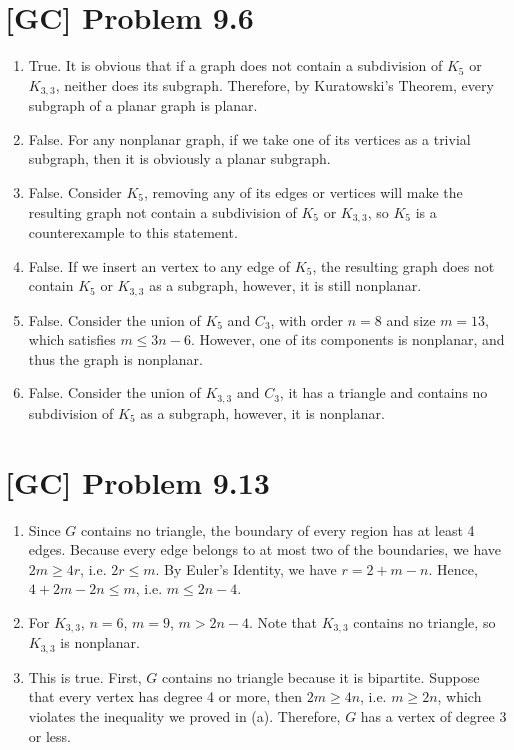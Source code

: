 \documentclass[a4paper,11pt,twocolumn]{article}
\begin{document}
  \section{[GC] Problem 9.6}
  \begin{enumerate}
    \item True. It is obvious that if a graph does not contain a subdivision of $K_5$ or $K_{3,3}$, neither does its subgraph. Therefore, by Kuratowski's Theorem, every subgraph of a planar graph is planar.
    \item False. For any nonplanar graph, if we take one of its vertices as a trivial subgraph, then it is obviously a planar subgraph.
    \item False. Consider $K_5$, removing any of its edges or vertices will make the resulting graph not contain a subdivision of $K_5$ or $K_{3,3}$, so $K_5$ is a counterexample to this statement.
    \item False. If we insert an vertex to any edge of $K_5$, the resulting graph does not contain $K_5$ or $K_{3,3}$ as a subgraph, however, it is still nonplanar.
    \item False. Consider the union of $K_5$ and $C_3$, with order $n = 8$ and size $m = 13$, which satisfies $m \leq 3n-6$. However, one of its components is nonplanar, and thus the graph is nonplanar.
    \item False. Consider the union of $K_{3,3}$ and $C_3$, it has a triangle and contains no subdivision of $K_5$ as a subgraph, however, it is  nonplanar.
  \end{enumerate}

  \section{[GC] Problem 9.13}
  \begin{enumerate}
    \item Since $G$ contains no triangle, the boundary of every region has at least 4 edges. Because every edge belongs to at most two of the boundaries, we have $2m \geq 4r$, i.e. $2r \leq m$. By Euler's Identity, we have $r=2+m-n$. Hence, $4+2m-2n \leq m$, i.e. $m \leq 2n-4$.
    \item For $K_{3,3}$, $n = 6$, $m = 9$, $m > 2n - 4$. Note that $K_{3,3}$ contains no triangle, so $K_{3,3}$ is nonplanar.
    \item This is true. First, $G$ contains no triangle because it is bipartite. Suppose that every vertex has degree 4 or more, then $2m \geq 4n$, i.e. $m \geq 2n$, which violates the inequality we proved in (a). Therefore, $G$ has a vertex of degree 3 or less.
  \end{enumerate}
\end{document}
